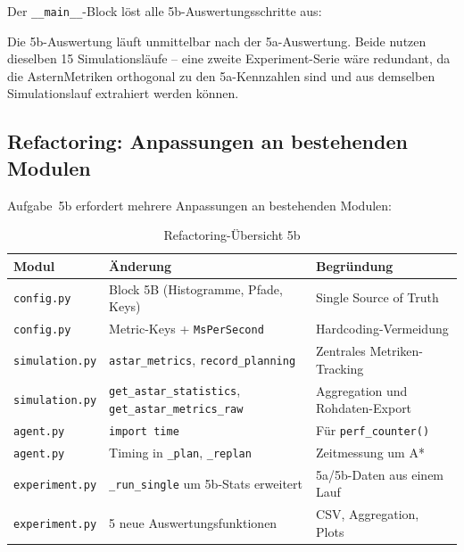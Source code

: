 Der \texttt{\_\_main\_\_}-Block löst alle 5b-Auswertungsschritte aus:



Die 5b-Auswertung läuft unmittelbar nach der 5a-Auswertung. Beide nutzen dieselben 15 Simulationsläufe -- eine zweite Experiment-Serie wäre redundant, da die \acs{Astern}Metriken orthogonal zu den 5a-Kennzahlen sind und aus demselben Simulationslauf extrahiert werden können.


\subsection{Refactoring: Anpassungen an bestehenden Modulen}

Aufgabe~5b erfordert mehrere Anpassungen an bestehenden Modulen:

\begin{table}[H]
    \centering
    \scriptsize
    \begin{tabular}{l l l}
        \toprule
        \textbf{Modul} & \textbf{Änderung} & \textbf{Begründung} \\
        \midrule
        \texttt{config.py} & Block 5B (Histogramme, Pfade, Keys) & Single Source of Truth \\
        \texttt{config.py} & Metric-Keys + \texttt{MsPerSecond} & Hardcoding-Vermeidung \\
        \texttt{simulation.py} & \texttt{astar\_metrics}, \texttt{record\_planning} & Zentrales Metriken-Tracking \\
        \texttt{simulation.py} & \texttt{get\_astar\_statistics}, \texttt{get\_astar\_metrics\_raw} & Aggregation und Rohdaten-Export \\
        \texttt{agent.py} & \texttt{import time} & Für \texttt{perf\_counter()} \\
        \texttt{agent.py} & Timing in \texttt{\_plan}, \texttt{\_replan} & Zeitmessung um A* \\
        \texttt{experiment.py} & \texttt{\_run\_single} um 5b-Stats erweitert & 5a/5b-Daten aus einem Lauf \\
        \texttt{experiment.py} & 5 neue Auswertungsfunktionen & CSV, Aggregation, Plots \\
        \bottomrule
    \end{tabular}
    \caption{Refactoring-Übersicht 5b}
    \label{tab:refactoring_5b}
\end{table}

